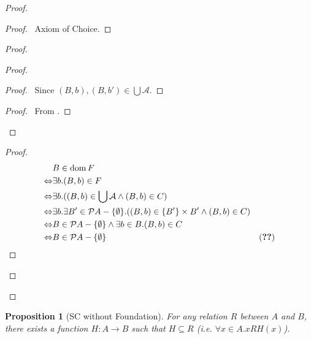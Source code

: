 \documentclass{book}
\let\qed\relax
\newtheorem{prop}[ax]{Proposition}
\theoremstyle{definition}
\newcommand{\dom}{\ensuremath{\operatorname{dom}}}
\newcommand{\ran}{\ensuremath{\operatorname{ran}}}
\begin{document}
\begin{proof}
\pf
{}
\begin{proof}
	\pf\ Axiom of Choice.
\end{proof}
\begin{proof}
	\begin{proof}
		\begin{proof}
			\pf\ Since $(B,b),(B,b') \in \bigcup \mathcal{A}$.
		\end{proof}
		\begin{proof}
			\pf\ From .
		\end{proof}
	\end{proof}
	\step{b}{$\dom F = \mathcal{P} A - \{ \emptyset \}$}
	\begin{proof}
		\pf
		\begin{align*}
			& B \in \dom F \\
			\Leftrightarrow & \exists b. (B,b) \in F \\
			\Leftrightarrow & \exists b. ((B,b) \in \bigcup \mathcal{A} \wedge (B,b) \in C) \\
			\Leftrightarrow & \exists b. \exists B' \in \mathcal{P} A - \{ \emptyset \}. ((B,b) \in \{ B' \} \times B' \wedge (B,b) \in C) \\
			\Leftrightarrow & B \in \mathcal{P} A - \{ \emptyset \} \wedge \exists b \in B. (B,b) \in C \\
			\Leftrightarrow & B \in \mathcal{P} A - \{ \emptyset \} & (\text{\stepref{5}})
		\end{align*}
	\end{proof}
	\step{c}{$\ran F \subseteq A$}
\end{proof}
\qed
\end{proof}

\begin{prop}[SC without Foundation]
\label{prop:AxChoice}
For any relation $R$ between $A$ and $B$, there exists a function $H : A \rightarrow B$ such that $H \subseteq R$ (i.e. $\forall x \in A. xRH(x)$).
\end{prop}
\end{document}
